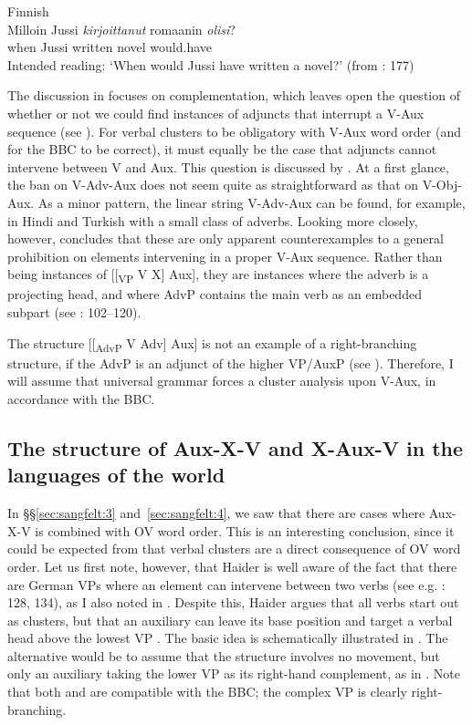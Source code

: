 \documentclass[output=paper, colorlinks, citecolor=brown]{langscibook}
\begin{document}
\ex Finnish\label{ex:sangfelt:29b}\\
\gll * Milloin Jussi \textit{kirjoittanut} {romaanin} \textit{olisi}? \\
 {} when Jussi written novel would.have\\
\glt Intended reading: ‘When would Jussi have written a novel?’ (from \citealt{BiberauerEtAl2014}: 177)\\
\z 
\z 


The discussion in \citet{BiberauerEtAl2014} focuses on complementation, which leaves open the question of whether or not we could find instances of adjuncts that interrupt a V-Aux sequence (see ). For verbal clusters to be obligatory with V-Aux word order (and for the BBC to be correct), it must equally be the case that adjuncts cannot intervene between V and Aux. This question is discussed by \citet{Sheehan2017Final}. At a first glance, the ban on V-Adv-Aux does not seem quite as straightforward as that on V-Obj-Aux. As a minor pattern, the linear string V-Adv-Aux can be found, for example, in Hindi and Turkish with a small class of adverbs. Looking more closely, however, \citet{Sheehan2017Final} concludes that these are only apparent counterexamples to a general prohibition on elements intervening in a proper V-Aux sequence. Rather than being instances of [[\textsubscript{VP} V X] Aux], they are instances where the adverb is a projecting head, and where AdvP contains the main verb as an embedded subpart (see \citealt{Sheehan2017Final}: 102–120).


The structure [[\textsubscript{AdvP} V Adv] Aux] is not an example of a right-branching structure, if the AdvP is an adjunct of the higher VP/AuxP (see \citealt{Haider2013}). Therefore, I will assume that universal grammar forces a cluster analysis upon V-Aux, in accordance with the BBC. 


\subsection{The structure of Aux-X-V and X-Aux-V in the languages of the world}\label{sec:sangfelt:5.2}

In §§\ref{sec:sangfelt:3} and~\ref{sec:sangfelt:4}, we saw that there are cases where Aux-X-V is combined with OV word order. This is an interesting conclusion, since it could be expected from \citet{Haider2010} that verbal clusters are a direct consequence of OV word order. Let us first note, however, that Haider is well aware of the fact that there are German VPs where an element can intervene between two verbs (see e.g. \citealt{Haider2013}: 128, 134), as I also noted in . Despite this, Haider argues that all verbs start out as clusters, but that an auxiliary can leave its base position and target a verbal head above the lowest VP \parencites[290–291]{Haider2010}[134]{Haider2013}. The basic idea is schematically illustrated in . The alternative would be to assume that the structure involves no movement, but only an auxiliary taking the lower VP as its right-hand complement, as in . Note that both  and  are compatible with the BBC; the complex VP is clearly right-branching.
\end{document}
